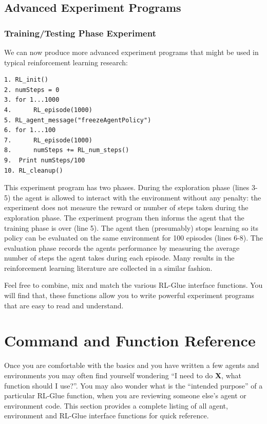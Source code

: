 \documentclass[11pt]{article}
\begin{document}
\subsection{Advanced Experiment Programs}
\label{expp2}


\subsubsection{Training/Testing Phase Experiment}
We can now produce more advanced experiment programs that might be used in typical reinforcement learning research:
\begin{verbatim}
1. RL_init()
2. numSteps = 0
3. for 1...1000
4.      RL_episode(1000)
5. RL_agent_message("freezeAgentPolicy")
6. for 1...100
7.      RL_episode(1000)
8.      numSteps += RL_num_steps()
9.  Print numSteps/100
10. RL_cleanup()
\end{verbatim}

This experiment program has two phases. During the exploration phase (lines 3-5) the agent is allowed to interact with the environment without any penalty: the experiment does not measure the reward or number of steps taken during the exploration phase. The experiment program then informs the agent that the training phase is over (line 5). The agent then (presumably) stops learning so its policy can be evaluated on the same environment for 100 episodes (lines 6-8). The evaluation phase records the agents performance by measuring the average number of steps the agent takes during each episode. Many results in the reinforcement learning literature are collected in a similar fashion.

Feel free to combine, mix and match the various RL-Glue interface functions. You will find that, these functions allow you to write powerful experiment programs that are easy to read and understand. 


\section{Command and Function Reference}
\label{ref}
Once you are comfortable with the basics and you have written a few agents and environments you may often find yourself wondering ``I need to do {\bf X}, what function should I use?''. You may also wonder what is the ``intended purpose'' of a particular RL-Glue function, when you are reviewing someone else's agent or environment code. This section provides a complete listing of all agent, environment and RL-Glue interface functions for quick reference.
\end{document}
